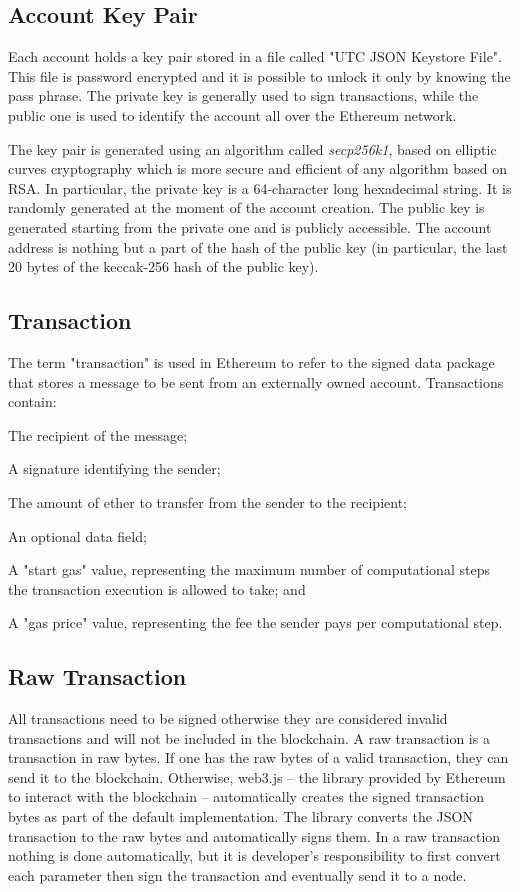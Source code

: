 \subsection*{Account Key Pair}
Each account holds a key pair stored in a file called "UTC JSON Keystore File". This file is password encrypted and it is possible to unlock it only by knowing the pass phrase. The private key is generally used to sign transactions, while the public one is used to identify the account all over the Ethereum network. 

The key pair is generated using an algorithm called \textit{secp256k1}, based on elliptic curves cryptography which is more secure and efficient of any algorithm based on RSA. In particular, the private key is a 64-character long hexadecimal string. It is randomly generated at the moment of the account creation. The public key is generated starting from the private one and is publicly accessible. The account address is nothing but a part of the hash of the public key (in particular, the last 20 bytes of the keccak-256 hash of the public key).

\subsection*{Transaction}
The term "transaction" is used in Ethereum to refer to the signed data package that stores a message to be sent from an externally owned account. Transactions contain:
\begin{list}{}
\item The recipient of the message; 
\item A signature identifying the sender;
\item The amount of ether to transfer from the sender to the recipient;
\item An optional data field;
\item A "start gas" value, representing the maximum number of computational steps the transaction execution is allowed to take; and
\item A "gas price" value, representing the fee the sender pays per computational step.
\end{list}

\subsection*{Raw Transaction}
All transactions need to be signed otherwise they are considered invalid transactions and will not be included in the blockchain. A raw transaction is a transaction in raw bytes. If one has the raw bytes of a valid transaction, they can send it to the blockchain. Otherwise, web3.js -- the library provided by Ethereum to interact with the blockchain -- automatically creates the signed transaction bytes as part of the default implementation. The library converts the JSON transaction to the raw bytes and automatically signs them. In a raw transaction nothing is done automatically, but it is developer's responsibility to first convert each parameter then sign the transaction and eventually send it to a node. 

